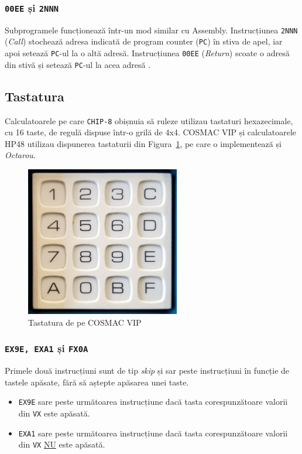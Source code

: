 \documentclass[a4paper]{article}
\begin{document}
\subsubsection{\texttt{00EE} și \texttt{2NNN}}
Subprogramele funcționează într-un mod similar cu Assembly. Instrucțiunea \texttt{2NNN} (\textit{Call}) stochează adresa indicată de program counter (\texttt{PC})
în stiva de apel, iar apoi setează \texttt{PC}-ul la o altă adresă. Instrucțiunea \texttt{00EE} (\textit{Return}) scoate o adresă din stivă și setează \texttt{PC}-ul
la acea adresă \cite{langhoff}.

\subsection{Tastatura}
Calculatoarele pe care \texttt{CHIP-8} obișnuia să ruleze utilizau tastaturi hexazecimale, cu 16 taste, de regulă dispuse într-o grilă de 4x4.
COSMAC VIP și calculatoarele HP48 utilizau dispunerea tastaturii din Figura~\ref{fig:keypad}, pe care o implementează și \textit{Octarou}.

\begin{figure}
	\begin{center}
		\includegraphics[width=0.6\textwidth]{figures/cosmac-vip-keypad.png}
	\end{center}
	\caption{Tastatura de pe COSMAC VIP}
	\label{fig:keypad}
\end{figure}

\subsubsection{\texttt{EX9E, EXA1} și \texttt{FX0A}}
Primele două instrucțiuni sunt de tip \textit{skip} și sar peste instrucțiuni în funcție de tastele apăsate, fără să aștepte apăsarea unei taste.
\begin{itemize}
	\item \texttt{EX9E} sare peste următoarea instrucțiune dacă tasta corespunzătoare valorii din \texttt{VX} este apăsată.
	\item \texttt{EXA1} sare peste următoarea instrucțiune dacă tasta corespunzătoare valorii din \texttt{VX} \underline{NU} este apăsată.
\end{itemize}
\end{document}
